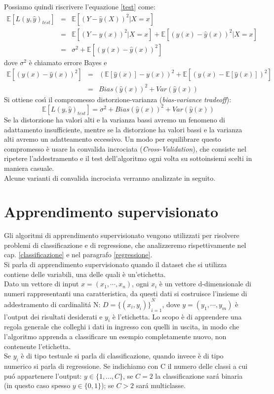 \documentclass[a4paper,12pt,oneside]{book}
\begin{document}
Possiamo quindi riscrivere l'equazione \ref{test} come:
\begin{eqnarray}
\mathbb{E} [L(y,\hat{y})_{test}] &=&\mathbb{E} [(Y-\hat{y}(X))^{2}|X=x]\nonumber\\
&=&\mathbb{E}[(Y-y(x))^2 |X=x]+\mathbb{E}[(y(x)-\hat{y}(x))^{2}|X=x]\nonumber\\
&=&\sigma^{2}+\mathbb{E}[(y(x)-\hat{y}(x))^{2}]
\end{eqnarray}
dove $\sigma^{2}$ \`e chiamato errore Bayes e
\begin{eqnarray}
\mathbb{E}[(y(x)-\hat{y}(x))^{2}]&=&(\mathbb{E}[\hat{y}(x)]-y(x))^{2}+\mathbb{E}[(\hat{y}(x)-\mathbb{E}[\hat{y}(x)])^{2}]\nonumber\\
&=&Bias(\hat{y}(x))^{2}+Var(\hat{y}(x))
\end{eqnarray}
Si ottiene cos\'{\i} il compromesso distorzione-varianza (\textit{bias-variance tradeoff}):
\begin{equation}
\mathbb{E} [L(y,\hat{y})_{test}]=\sigma^2+Bias(\hat{y}(x))^2 + Var(\hat{y}(x))
\end{equation}
Se la distorzione ha valori alti e la varianza bassi avremo un fenomeno di adattamento insufficiente, mentre se la distorzione ha valori bassi e la varianza alti avremo un adatteamento eccessivo.\cite{errval}
Un modo per equilibrare questo compromesso \`e usare la convalida incrociata (\textit{Cross-Validation}), che consiste nel ripetere l'addestramento e il test dell'algoritmo ogni volta su sottoinsiemi scelti in maniera casuale.\\
Alcune varianti di convalida incrociata verranno analizzate in seguito.

\section{Apprendimento supervisionato}
Gli algoritmi di apprendimento supervisionato vengono utilizzati per risolvere problemi di classificazione e di regressione, che analizzeremo rispettivamente nel cap. \ref{classificazione} e nel paragrafo \ref{regressione}.\\
Si parla di apprendimento supervisionato quando il dataset che si utilizza contiene delle variabili, una delle quali \`e un'etichetta.\\
Dato un vettore di input $x=(x_{1},\cdots,x_{n})$, ogni $x_{i}$ \`e un vettore d-dimensionale di numeri rappresentanti una caratteristica, da questi dati si costruisce l'insieme di addestramento di cardinalit\'{a} N: $D={\{ (x_{i},y_{i})\}}^{N}_{i=1}$, dove $y=(y_{1},\cdots,y_{m})$ \`e l'output dei risultati desiderati e $y_{i}$ \`e l'etichetta.
Lo scopo \`e di apprendere una regola generale che colleghi i dati in ingresso con quelli in uscita, in modo che l'algoritmo apprenda a classificare un esempio completamente nuovo, non contenente l'etichetta.\\
Se $y_{i}$ \`e di tipo testuale si parla di classificazione, quando invece \`e di tipo numerico si parla di regressione. Se indichiamo con C il numero delle classi a cui pu\'{o} appartenere l'output: $y\in \{1,...,C\}$, se $C=2$ la classificazione sar\'{a} binaria (in questo caso spesso $y\in \{0,1\}$); se $C>2$ sar\'{a} multiclasse.\\
\end{document}
